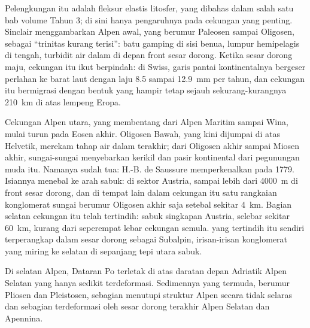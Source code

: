 Pelengkungan itu adalah fleksur elastis litosfer, yang dibahas dalam salah satu bab volume Tahun 3;
di sini hanya pengaruhnya pada cekungan yang penting. Sinclair menggambarkan  Alpen awal, yang berumur Paleosen sampai Oligosen,
sebagai ``trinitas kurang terisi'': batu gamping di sisi benua, lumpur hemipelagis di
tengah, turbidit air dalam di depan front sesar dorong. Ketika sesar dorong maju, cekungan itu
ikut berpindah: di Swiss, garis pantai kontinentalnya bergeser perlahan ke barat laut dengan laju 8.5
sampai \qty{12.9}{mm} per tahun, dan cekungan itu bermigrasi dengan bentuk yang hampir tetap sejauh sekurang-kurangnya
\qty{210}{km} di atas lempeng Eropa.

Cekungan  Alpen utara, yang membentang dari Alpen Maritim sampai Wina, mulai
turun pada Eosen akhir.  Oligosen Bawah, yang kini dijumpai di atas 
Helvetik, merekam tahap air dalam terakhir; dari Oligosen akhir sampai Miosen akhir, sungai-sungai
menyebarkan kerikil dan pasir kontinental dari pegunungan muda itu. Namanya sudah tua: H.-B. de Saussure
memperkenalkan \emph{} pada 1779. Isiannya menebal ke arah sabuk: di
sektor Austria, sampai lebih dari \qty{4000}{m} di front sesar dorong, dan di tempat lain dalam cekungan itu
satu rangkaian konglomerat sungai berumur Oligosen akhir saja setebal sekitar \qty{4}{km}. Bagian selatan
cekungan itu telah tertindih: sabuk singkapan Austria, selebar sekitar \qty{60}{km}, kurang
dari seperempat lebar cekungan semula.  yang tertindih itu sendiri terperangkap dalam
sesar dorong sebagai  Subalpin, irisan-irisan konglomerat yang miring ke selatan di sepanjang
tepi utara sabuk.

Di selatan Alpen, Dataran Po terletak di atas daratan depan Adriatik Alpen Selatan yang hanya sedikit
terdeformasi. Sedimennya yang termuda, berumur Pliosen dan Pleistosen, sebagian menutupi struktur
Alpen secara tidak selaras dan sebagian terdeformasi oleh sesar dorong terakhir Alpen Selatan
dan Apennina.

